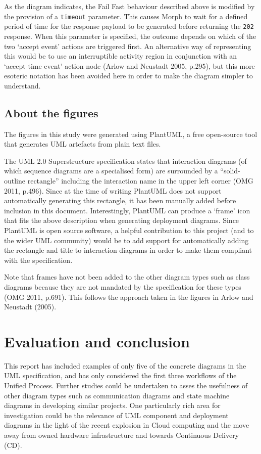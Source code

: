 \documentclass[a4paper]{article}
\begin{document}
As the diagram indicates, the Fail Fast behaviour described above is modified by the provision of a \texttt{timeout} parameter. This causes Morph to wait for a defined period of time for the response payload to be generated before returning the \texttt{202} response. When this parameter is specified, the outcome depends on which of the two `accept event' actions are triggered first. An alternative way of representing this would be to use an interruptible activity region in conjunction with an `accept time event' action node (Arlow and Neustadt 2005, p.295), but this more esoteric notation has been avoided here in order to make the diagram simpler to understand.

\subsection{About the figures}

The figures in this study were generated using PlantUML, a free open-source tool\cite{plantuml} that generates UML artefacts from plain text files.

The UML 2.0 Superstructure specification states that interaction diagrams (of which sequence diagrams are a specialised form) are surrounded by a ``solid-outline rectangle'' including the interaction name in the upper left corner (OMG 2011, p.496). Since at the time of writing PlantUML does not support automatically generating this rectangle, it has been manually added before inclusion in this document. Interestingly, PlantUML can produce a `frame' icon that fits the above description when generating deployment diagrams. Since PlantUML is open source software, a helpful contribution to this project (and to the wider UML community) would be to add support for automatically adding the rectangle and title to interaction diagrams in order to make them compliant with the specification. 

Note that frames have not been added to the other diagram types such as class diagrams because they are not mandated by the specification for these types (OMG 2011, p.691). This follows the approach taken in the figures in Arlow and Neustadt (2005).

\section{Evaluation and conclusion}

This report has included examples of only five of the concrete diagrams in the UML specification, and has only considered the first three workflows of the Unified Process. Further studies could be undertaken to asses the usefulness of other diagram types such as communication diagrams and state machine diagrams in developing similar projects. One particularly rich area for investigation could be the relevance of UML component and deployment diagrams in the light of the recent explosion in Cloud computing and the move away from owned hardware infrastructure and towards Continuous Delivery (CD).
\end{document}
